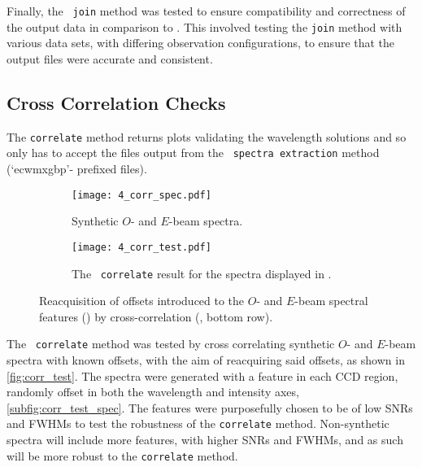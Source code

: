 Finally, the \stops\ \texttt{join} method was tested to ensure compatibility and correctness of the output data in comparison to \polsalt.
This involved testing the \texttt{join} method with various data sets, with differing observation configurations, to ensure that the output files were accurate and consistent.

\subsection[The \texttt{correlate} Method]{Cross Correlation Checks} \label{subsec:test_corr}

The \texttt{correlate} method returns plots validating the wavelength solutions and so only has to accept the files output from the \polsalt\ \texttt{spectra extraction}  method (`ecwmxgbp'- prefixed files).

\begin{figure}
    \centering
    \begin{subfigure}[b]{\textwidth}
        \centering
        \texttt{[image: 4\_corr\_spec.pdf]}
        \caption{Synthetic $O$- and $E$-beam spectra.}
        \label{subfig:corr_test_spec}
    \end{subfigure}
    \hfill
    \begin{subfigure}[b]{\textwidth}
        \centering
        \texttt{[image: 4\_corr\_test.pdf]}
        \caption{The \stops\ \texttt{correlate} result for the spectra displayed in .}
        \label{subfig:corr_test_corr}
    \end{subfigure}
    \caption{Reacquisition of offsets introduced to the $O$- and $E$-beam spectral features () by cross-correlation (, bottom row).}
    \label{fig:corr_test}
\end{figure}

The \stops\ \texttt{correlate} method was tested by cross correlating synthetic $O$- and $E$-beam spectra with known offsets, with the aim of reacquiring said offsets, as shown in \autoref{fig:corr_test}.
The spectra were generated with a feature in each \gls{CCD} region, randomly offset in both the wavelength and intensity axes, \autoref{subfig:corr_test_spec}.
The features were purposefully chosen to be of low \glspl{SNR} and \glspl{FWHM} to test the robustness of the \texttt{correlate} method.
Non-synthetic spectra will include more features, with higher \glspl{SNR} and \glspl{FWHM}, and as such will be more robust to the \texttt{correlate} method.

